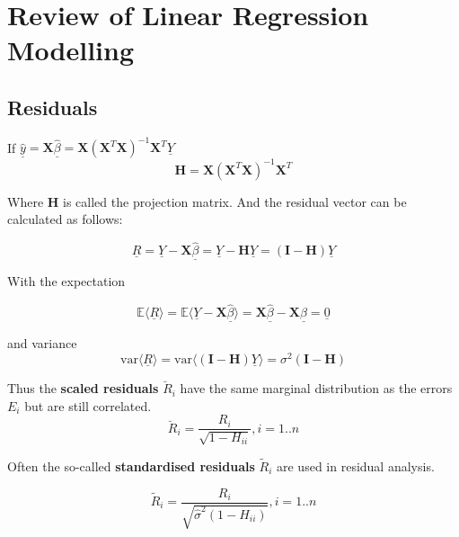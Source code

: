 \documentclass[11pt]{article}
\begin{document}
\section{Review of Linear Regression Modelling}

\subsection{Residuals}
If $\underline{\widehat{y}} = \textbf{X}\underline{\widehat{\beta}} = \textbf{X} (\textbf{X}^T \textbf{X})^{-1} \textbf{X}^T \underline{Y}$
\begin{equation*}
	\textbf{H} = \textbf{X} (\textbf{X}^T \textbf{X})^{-1} \textbf{X}^T
\end{equation*}

\noindent
Where $\textbf{H}$ is called the projection matrix. And the residual vector can be calculated as follows:

\begin{equation*}
	\underline{R} = \underline{Y} - \textbf{X} \underline{\widehat{\beta}} = \underline{Y} - \textbf{H} \underline{Y} = (\textbf{I} - \textbf{H}) \underline{Y}
\end{equation*}

\noindent
With the expectation

\begin{equation*}
	\mathbb{E}\langle\underline{R} \rangle = \mathbb{E}\langle\underline{Y} - \textbf{X} \underline{\widehat{\beta}} \rangle = \textbf{X} \underline{\widehat{\beta}} - \textbf{X} \underline{\widehat{\beta}} = \underline{0}
\end{equation*}

\noindent
and variance
\begin{equation*}
	\text{var}\langle \underline{R} \rangle = \text{var}\langle (\textbf{I} - \textbf{H}) \underline{Y} \rangle = \sigma^2 (\textbf{I} - \textbf{H})
\end{equation*}

\noindent
Thus the \textbf{scaled residuals} $\breve{R}_i$ have the same marginal distribution as the errors $E_i$ but are still correlated.
\begin{equation*}
	\breve{R}_i = \frac{R_i}{\sqrt{1-H_{ii}}}, i=1..n
\end{equation*}

\noindent
Often the so-called \textbf{standardised residuals} $\tilde{R}_i$ are used in residual analysis.

\begin{equation*}
	\tilde{R}_i = \frac{R_i}{\sqrt{\widehat{\sigma}^2(1-H_{ii})}}, i=1..n
\end{equation*}
\end{document}
